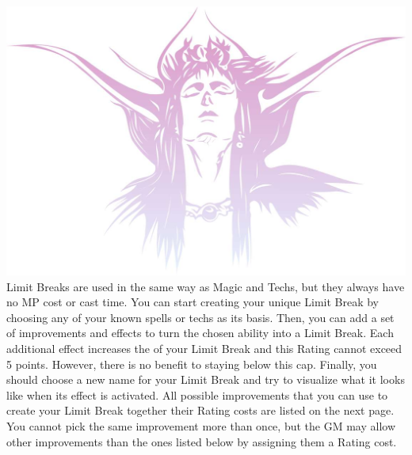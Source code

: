 %
\newpage
%
%
\ofpar
%
\includegraphics[width=\columnwidth]{./art/images/ff2.jpg}
%
\ofpar
%
Limit Breaks are used in the same way as Magic and Techs, but they always have no MP cost or cast time.
You can start creating your unique Limit Break by choosing any of your known spells or techs as its basis.
Then, you can add a set of improvements and effects to turn the chosen ability into a Limit Break.
Each additional effect increases the  of your Limit Break and this Rating cannot exceed 5 points.
However, there is no benefit to staying below this cap.
Finally, you should choose a new name for your Limit Break and try to visualize what it looks like when its effect is activated.
All possible improvements that you can use to create your Limit Break together their Rating costs are listed on the next page.
You cannot pick the same improvement more than once, but the GM may allow other improvements than the ones listed below by assigning them a Rating cost.
%
\ofpar
%
